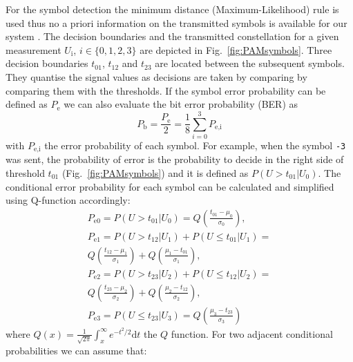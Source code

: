 \documentclass[journal]{IEEEtran}
\begin{document}
For the symbol detection the minimum distance (Maximum-Likelihood) rule is used  thus no a priori information on the transmitted symbols is available for our system \cite{proakis2008digital}. 
%
The decision boundaries and the transmitted constellation  for a given measurement $U_\text{i}$, $ i\in \lbrace 0, 1, 2, 3  \rbrace$ are depicted in Fig.~\ref{fig:PAMsymbols}.
%
Three decision boundaries $t_\text{01}$, $t_\text{12}$ and $t_\text{23}$    are located between the
subsequent symbols.
%
They quantise the signal values as decisions are taken by comparing by comparing them with the thresholds.
%
If  the symbol error probability  can be defined as $P_\text{e}$ we can also evaluate the bit error probability (BER) as 
%
\begin{equation}
P_\text{b} =\frac{ P_\text{e}} {2}= \frac{1} {8} \sum_{i=0}^{3} P_\text{e,i}
\label{eq:pb}
\end{equation}
%
with $P_\text{e,i}$ the   error probability of each symbol.
%
For  example, when the symbol \texttt{-3} was sent,  the probability of error is the probability to decide in  the right side of threshold $t_\text{01}$ (Fig.~\ref{fig:PAMsymbols}) and it is defined as $P ( U>t_\text{01}|U_\text{0})$.
%
The conditional error probability for each symbol can be  calculated and simplified using Q-function  accordingly:
%
\begin{equation}
\begin{gathered}
P_\text{e0}= P ( U>t_\text{01}|U_\text{0})=Q \left(\frac{t_\text{01}-\mu_\text{0}} {\sigma_\text{0}} \right),\\
P_\text{e1}= P ( U>t_\text{12}|U_\text{1})+P ( U \leq t_\text{01}|U_\text{1})=\\
Q \left(\frac{t_\text{12}-\mu_\text{1}} {\sigma_\text{1}} \right)+Q \left(\frac{\mu_\text{1}-t_\text{01}} {\sigma_\text{1}}\right),\\
P_\text{e2}= P ( U>t_\text{23}|U_\text{2})+P ( U \leq t_\text{12}|U_\text{2})=\\
Q \left(\frac{t_\text{23}-\mu_\text{2}} {\sigma_\text{2}} \right)+Q \left(\frac{\mu_\text{2}-t_\text{12}} {\sigma_\text{2}}\right),\\
P_\text{e3}= P ( U\leq t_\text{23}|U_\text{3})=Q \left(\frac{\mu_\text{3}-t_\text{23}} {\sigma_\text{3}}\right)
\end{gathered}
\label{eq:qf}
\end{equation}
%
where 
$Q(x)= \frac{1} {\sqrt {2\pi}}\int_x^{\infty} e^{-t^2/2}\mathrm{d}t$  the $Q$ function.
%
For two adjacent conditional probabilities we can assume that:
\end{document}

